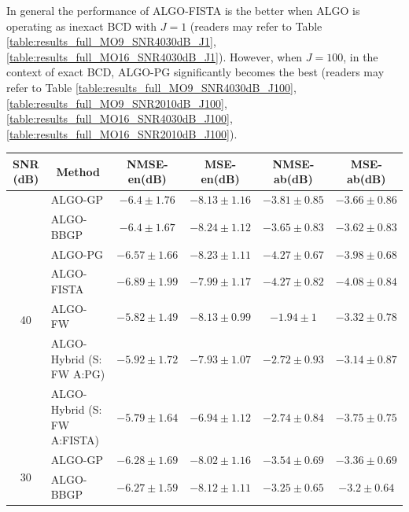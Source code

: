 In general the performance of ALGO-FISTA is the better when ALGO is operating
as inexact BCD with $J = 1$ (readers may refer to Table
\ref{table:results_full_MO9_SNR4030dB_J1},
\ref{table:results_full_MO16_SNR4030dB_J1}).
However, when $J = 100$, \ie in the context of exact BCD, ALGO-PG
significantly becomes the best (readers may refer to Table
\ref{table:results_full_MO9_SNR4030dB_J100},
\ref{table:results_full_MO9_SNR2010dB_J100},
\ref{table:results_full_MO16_SNR4030dB_J100},
\ref{table:results_full_MO16_SNR2010dB_J100}).

\begin{table}[h]
\centering
\begin{adjustbox}{max width=\textwidth}
\begin{tabular}{|c|l|c|c|c|c|}
\hline
SNR (dB)            & \multicolumn{1}{c|}{Method}       & NMSE-en(dB)         & MSE-en(dB)          & NMSE-ab(dB)         & MSE-ab(dB)          \tabularnewline \hline
\multirow{7}{*}{40} & ALGO-GP                    & $-6.4     \pm 1.76$ & $-8.13    \pm 1.16$ & $-3.81    \pm 0.85$ & $-3.66    \pm 0.86$ \tabularnewline
                    & ALGO-BBGP                  & $-6.4     \pm 1.67$ & $-8.24    \pm 1.12$ & $-3.65    \pm 0.83$ & $-3.62    \pm 0.83$ \tabularnewline
                    & ALGO-PG                    & $-6.57    \pm 1.66$ & $-8.23    \pm 1.11$ & $-4.27    \pm 0.67$ & $-3.98    \pm 0.68$ \tabularnewline
                    & ALGO-FISTA                 & $-6.89    \pm 1.99$ & $-7.99    \pm 1.17$ & $-4.27    \pm 0.82$ & $-4.08    \pm 0.84$ \tabularnewline
                    & ALGO-FW                    & $-5.82    \pm 1.49$ & $-8.13    \pm 0.99$ & $-1.94    \pm  1$   & $-3.32    \pm 0.78$ \tabularnewline
                    & ALGO-Hybrid (S: FW A:PG)   & $-5.92    \pm 1.72$ & $-7.93    \pm 1.07$ & $-2.72    \pm 0.93$ & $-3.14    \pm 0.87$ \tabularnewline
                    & ALGO-Hybrid (S: FW A:FISTA)& $-5.79    \pm 1.64$ & $-6.94    \pm 1.12$ & $-2.74    \pm 0.84$ & $-3.75    \pm 0.75$ \tabularnewline \hline
\multirow{7}{*}{30} & ALGO-GP                    & $-6.28    \pm 1.69$ & $-8.02    \pm 1.16$ & $-3.54    \pm 0.69$ & $-3.36    \pm 0.69$ \tabularnewline
                    & ALGO-BBGP                  & $-6.27    \pm 1.59$ & $-8.12    \pm 1.11$ & $-3.25    \pm 0.65$ & $-3.2     \pm 0.64$ \tabularnewline

\end{tabular}
\end{adjustbox}
\end{table}
